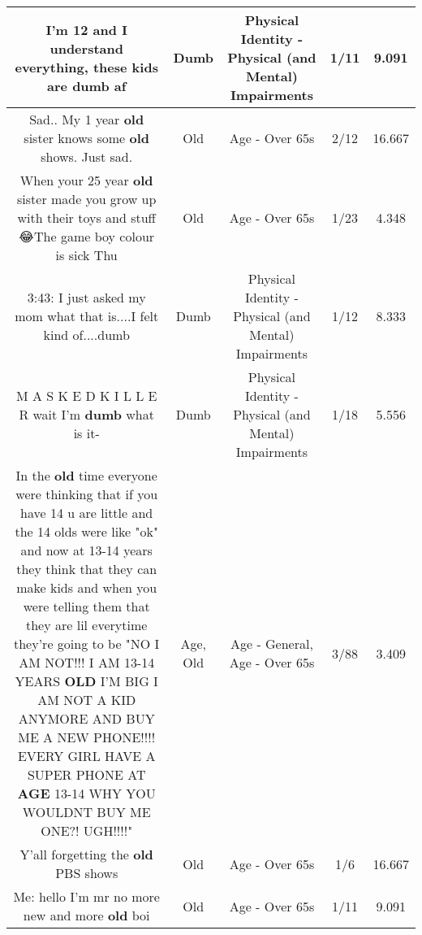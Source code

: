 \documentclass[11pt]{article}
\newlength\mylength
\begin{document}
\begin{center}
\begin{longtable}{|C{.65\mylength}|C{.30\mylength}|C{.12\mylength}|C{.12\mylength}|C{.12\mylength}|}
  \small I'm 12 and I understand everything, these kids are \textbf{dumb} af\normalsize   & Dumb & Physical Identity - Physical (and Mental) Impairments & 1/11 & 9.091 \\  \hline
  \small Sad.. My 1 year \textbf{old} sister knows some \textbf{old} shows. Just sad.\normalsize   & Old & Age - Over 65s & 2/12 & 16.667 \\  \hline
  \small When your 25 year \textbf{old} sister made you grow up with their toys and stuff 😂The game boy colour is sick Thu\normalsize   & Old & Age - Over 65s & 1/23 & 4.348 \\  \hline
  \small 3:43: I just asked my mom what that is....I felt kind of....dumb\normalsize   & Dumb & Physical Identity - Physical (and Mental) Impairments & 1/12 & 8.333 \\  \hline
  \small M A S K E D K I L L E R wait I'm \textbf{dumb} what is it-\normalsize   & Dumb & Physical Identity - Physical (and Mental) Impairments & 1/18 & 5.556 \\  \hline
  \small In the \textbf{old} time everyone were thinking that if you have 14 u are little and the 14 olds were like "ok" and now at 13-14 years they think that they can make kids and when you were telling them that they are lil everytime they're going to be "NO I AM NOT!!! I AM 13-14 YEARS \textbf{OLD} I'M BIG I AM NOT A KID ANYMORE AND BUY ME A NEW PHONE!!!! EVERY GIRL HAVE A SUPER PHONE AT \textbf{AGE} 13-14 WHY YOU WOULDNT BUY ME ONE?! UGH!!!!"\normalsize   & Age, Old & Age - General, Age - Over 65s & 3/88 & 3.409 \\  \hline
  \small Y'all forgetting the \textbf{old} PBS shows\normalsize   & Old & Age - Over 65s & 1/6 & 16.667 \\  \hline
  \small Me: hello I'm mr no more new and more \textbf{old} boi\normalsize   & Old & Age - Over 65s & 1/11 & 9.091 \\  \hline

\end{longtable}
\end{center}
\end{document}
